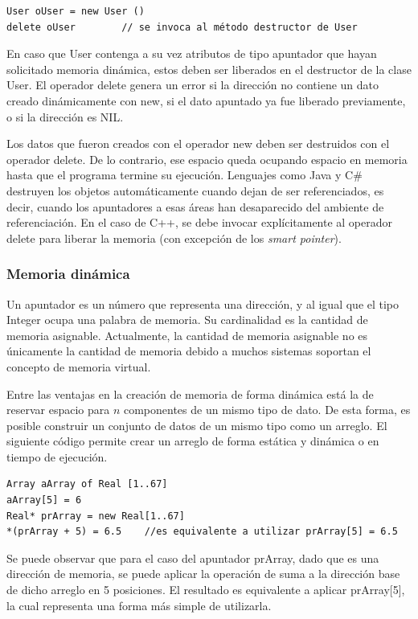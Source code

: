\begin{lstlisting}[upquote=true, language=pseudo]
User oUser = new User ()	
delete oUser		// se invoca al método destructor de User
\end{lstlisting}

En caso que User contenga a su vez atributos de tipo apuntador que hayan solicitado memoria dinámica, estos deben ser liberados en el destructor de la clase User. El operador delete genera un error si la dirección no contiene un dato creado dinámicamente con new, si el dato apuntado ya fue liberado previamente, o si la dirección es NIL.

Los datos que fueron creados con el operador new deben ser destruidos con el operador delete. De lo contrario, ese espacio queda ocupando espacio en memoria hasta que el programa termine su ejecución. Lenguajes como Java y C\# destruyen los objetos automáticamente cuando dejan de ser referenciados, es decir, cuando los apuntadores a esas áreas han desaparecido del ambiente de referenciación. En el caso de C++, se debe invocar explícitamente al operador delete para liberar la memoria (con excepción de los \textit{smart pointer}).

\subsubsection{Memoria dinámica}

Un apuntador es un número que representa una dirección, y al igual que el tipo Integer ocupa una palabra de memoria. Su cardinalidad es la cantidad de memoria asignable. Actualmente, la cantidad de memoria asignable no es únicamente la cantidad de memoria debido a muchos sistemas soportan el concepto de memoria virtual.

Entre las ventajas en la creación de memoria de forma dinámica está la de reservar espacio para $n$ componentes de un mismo tipo de dato. De esta forma, es posible construir un conjunto de datos de un mismo tipo como un arreglo. El siguiente código permite crear un arreglo de forma estática y dinámica o en tiempo de ejecución.

\begin{lstlisting}[upquote=true, language=pseudo]
Array aArray of Real [1..67]
aArray[5] = 6
Real* prArray = new Real[1..67]
*(prArray + 5) = 6.5  	//es equivalente a utilizar prArray[5] = 6.5
\end{lstlisting}

Se puede observar que para el caso del apuntador prArray, dado que es una dirección de memoria, se puede aplicar la operación de suma a la dirección base de dicho arreglo en 5 posiciones. El resultado es equivalente a aplicar prArray[5], la cual representa una forma más simple de utilizarla.

